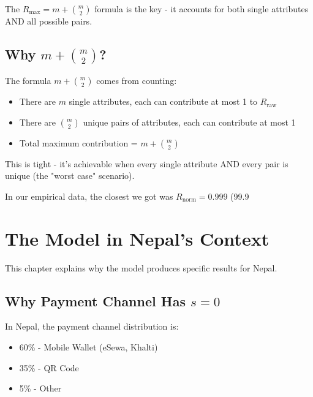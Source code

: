 \documentclass[12pt,a4paper,oneside,openany]{report}
\begin{document}
The $R_{\mathrm{max}} = m + \binom{m}{2}$ formula is the key - it accounts for both single attributes AND all possible pairs.

\section{Why $m + \binom{m}{2}$?}
\label{sec:why_formula}

The formula $m + \binom{m}{2}$ comes from counting:

\begin{itemize}
    \item There are $m$ single attributes, each can contribute at most 1 to $R_{\mathrm{raw}}$
    \item There are $\binom{m}{2}$ unique pairs of attributes, each can contribute at most 1
    \item Total maximum contribution = $m + \binom{m}{2}$
\end{itemize}

This is tight - it's achievable when every single attribute AND every pair is unique (the "worst case" scenario).

In our empirical data, the closest we got was $R_{\mathrm{norm}} = 0.999$ (99.9%

\chapter{The Model in Nepal's Context}
\label{chap:nepal}

This chapter explains why the model produces specific results for Nepal.

\section{Why Payment Channel Has $s = 0$}
\label{sec:nepal_payment}

In Nepal, the payment channel distribution is:
\begin{itemize}
    \item 60\% - Mobile Wallet (eSewa, Khalti)
    \item 35\% - QR Code
    \item 5\% - Other
\end{itemize}
\end{document}
